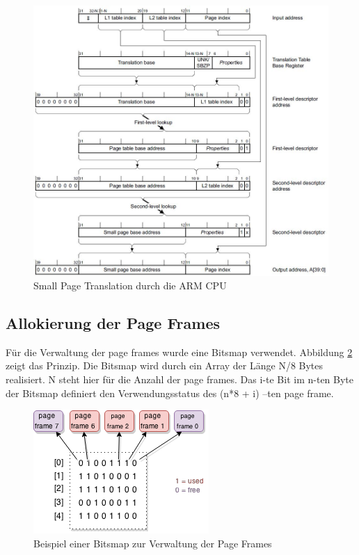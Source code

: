 \begin{figure}[H]
	\includegraphics[scale=0.8]{figures/smallPageTranslation}
	\caption{Small Page Translation durch die ARM CPU \cite[S. B3-1337]{ARM:ARM}}
	\label{fig:largePageTranslation}
\end{figure}


\subsection{Allokierung der Page Frames}

Für die Verwaltung der page frames wurde eine Bitsmap verwendet. Abbildung \ref{fig:BitsMap} zeigt das Prinzip.
Die Bitsmap wird durch ein Array der Länge N/8 Bytes realisiert. N steht hier für die Anzahl der page frames. Das i-te Bit im n-ten Byte der Bitsmap definiert den Verwendungsstatus des (n*8 + i) –ten page frame.


\begin{figure}[H]
	\centering
	\includegraphics[scale=1]{figures/BitsMap}
	\caption{Beispiel einer Bitsmap zur Verwaltung der Page Frames}
	\label{fig:BitsMap}
\end{figure}



\pagebreak 